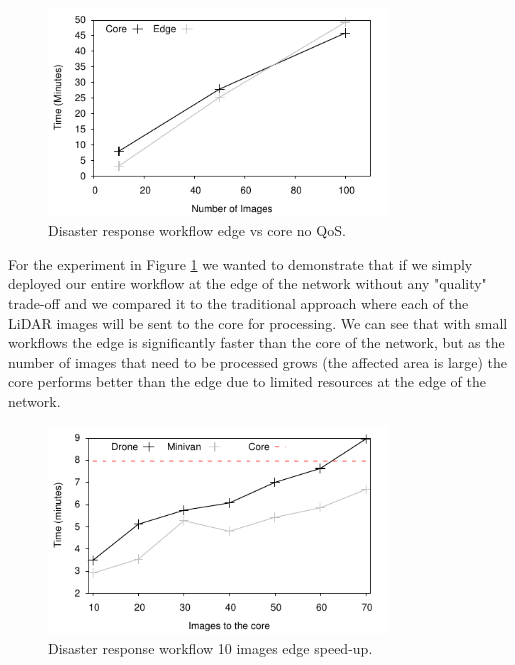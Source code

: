 \begin{figure}[h]
  \centering
  \includegraphics[width=0.8\textwidth]{Results/EdgeVCore}
  \caption{Disaster response workflow edge vs core no QoS.}
  \label{fig:Edge_CoreVsCloud}
\end{figure}

For the experiment in Figure \ref{fig:Edge_CoreVsCloud} we wanted to demonstrate that if we simply deployed our entire workflow at the edge of the network without any "quality" trade-off and we compared it to the traditional approach where each of the LiDAR images will be sent to the core for processing. We can see that with small workflows the edge is significantly faster than the core of the network, but as the number of images that need to be processed grows (the affected area is large) the core performs better than the edge due to limited resources at the edge of the network.

\begin{figure}[h]
  \centering
  \includegraphics[width=0.8\textwidth]{Results/SmallSpeed}
  \caption{Disaster response workflow 10 images edge speed-up.}
  \label{fig:SmallSpeed}
\end{figure}

